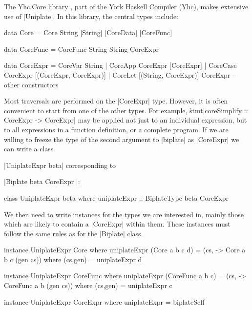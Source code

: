 \begin{example}
The Yhc.Core library \citep{me:yhc_core}, part of the York Haskell Compiler (Yhc), makes extensive use of |Uniplate|. In this library, the central types include:

\begin{comment}
\begin{code}
data CoreData = CoreData
instance Uniplate CoreExpr
\end{code}
\end{comment}

\begin{code}
data Core      =  Core String [String] [CoreData] [CoreFunc]

data CoreFunc  =  CoreFunc String String CoreExpr

data CoreExpr  =  CoreVar   String
               |  CoreApp   CoreExpr  [CoreExpr]
               |  CoreCase  CoreExpr  [(CoreExpr, CoreExpr)]
               |  CoreLet   [(String, CoreExpr)] CoreExpr
                  -- other constructors
\end{code}

Most traversals are performed on the |CoreExpr| type. However, it is often convenient to start from one of the other types. For example, \h{stmt}|coreSimplify :: CoreExpr -> CoreExpr| may be applied not just to an individual expression, but to all expressions in a function definition, or a complete program. If we are willing to freeze the type of the second argument to |biplate| as |CoreExpr| we can write a class \ignore|UniplateExpr beta| corresponding to \ignore|Biplate beta CoreExpr |:

\begin{code}
class  UniplateExpr beta where
       uniplateExpr :: BiplateType beta CoreExpr
\end{code}

We then need to write instances for the types we are interested in, mainly those which are likely to contain a |CoreExpr| within them. These instances must follow the same rules as for the |Biplate| class.

\begin{code}
instance UniplateExpr Core where
    uniplateExpr (Core a b c d) = (cs, \cs -> Core a b c (gen cs))
        where (cs,gen) = uniplateExpr d

instance UniplateExpr CoreFunc where
    uniplateExpr (CoreFunc a b c) = (cs, \cs -> CoreFunc a b (gen cs))
        where (cs,gen) = uniplateExpr c

instance UniplateExpr CoreExpr where
    uniplateExpr = biplateSelf


\end{code}
\end{example}
